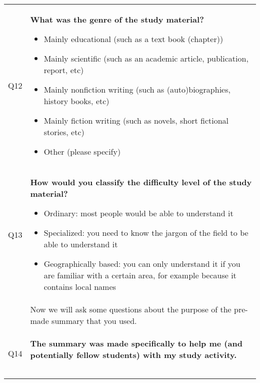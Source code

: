 \begin{xtabular}{@{\,}l <{\hskip 2pt} >{\raggedright\arraybackslash}p{0.82\textwidth}}
        \\

        Q12 & \textbf{What was the genre of the study material?}
        \begin{itemize}[label=$\square$, leftmargin=*, nosep]
          \item Mainly educational (such as a text book (chapter))
          \item Mainly scientific (such as an academic article, publication, report, etc)
          \item Mainly nonfiction writing (such as (auto)biographies, history books, etc)
          \item Mainly fiction writing (such as novels, short fictional stories, etc)
          \item Other (please specify)
        \end{itemize}

        \\

        Q13 & \textbf{How would you classify the difficulty level of the study material?}
        \begin{itemize}[label=$\square$, leftmargin=*, nosep]
          \item Ordinary: most people would be able to understand it
          \item Specialized: you need to know the jargon of the field to be able to understand it
          \item Geographically based: you can only understand it if you are familiar with a certain area, for example because it contains local names
        \end{itemize}

        \\

        & Now we will ask some questions about the purpose of the pre-made summary that you used. \\

        Q14 & \textbf{The summary was made specifically to help me (and potentially fellow students) with my study activity.}

        \begin{tabularx}{0.7\columnwidth}{
          !{\hskip 2pt}>{\centering\arraybackslash}p{0.11\columnwidth}
          !{\hskip 2pt}>{\centering\arraybackslash}p{0.11\columnwidth}
          !{\hskip 2pt}>{\centering\arraybackslash}p{0.11\columnwidth}
          !{\hskip 2pt}>{\centering\arraybackslash}p{0.11\columnwidth}
          !{\hskip 2pt}>{\centering\arraybackslash}p{0.11\columnwidth}
          !{\hskip 2pt}>{\centering\arraybackslash}p{0.11\columnwidth}}


\end{tabularx}
\end{xtabular}
